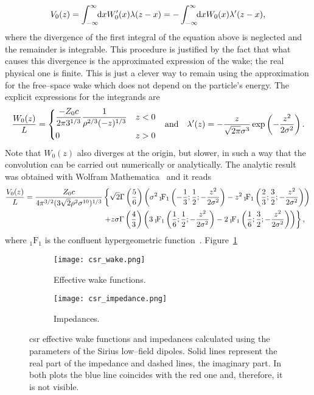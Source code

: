     \begin{align}\label{eq:csr_convolution}
        V_0(z) = \int_{-\infty}^{\infty}\!\!\text{d}x W'_0(x)\lambda(z-x) = -\int_{-\infty}^{\infty}\!\!\text{d}x W_0(x)\lambda'(z-x),
    \end{align}
    where the divergence of the first integral of the equation above is neglected and the remainder is integrable. This procedure is justified by the fact that what causes this divergence is the approximated expression of the wake; the real physical one is finite. This is just a clever way to remain using the approximation for the free--space wake which does not depend on the particle's energy. The explicit expressions for the integrands are
    \begin{align}
        \frac{W_0(z)}{L} =
        \begin{dcases}
            \frac{-Z_0 c}{2 \pi 3^{1/3}} \frac{1}{\rho^{2/3}(-z)^{1/3}} & z<0\\
            0 & z>0
        \end{dcases}& &\text{and} &&\lambda'(z) = -\frac{z}{\sqrt{2\pi}\sigma^3}\exp\left(-\frac{z^2}{2\sigma^2}\right).
    \end{align}
    Note that $W_0(z)$ also diverges at the origin, but slower, in such a way that the convolution can be carried out numerically or analytically. The analytic result was obtained with Wolfram Mathematica~\cite{WolframResearchInc.2016} and it reads
    \begin{align}\nonumber
        \frac{V_0(z)}{L} =
        \frac{Z_0 c}{4\pi^{3/2}(3\sqrt{2}\rho^2\sigma^{10})^{1/3}}
        &\left\{
            \sqrt{2}\Gamma\left(\frac56\right)
            \left(
                \sigma^2{\,}_{1}\!\text{F}_{1}\left(-\frac13;\frac12;-\frac{z^2}{2\sigma^2}\right) -
                      z^2{\,}_{1}\!\text{F}_{1}\left(\frac23;\frac32;-\frac{z^2}{2\sigma^2}\right)
                \right)\right. \\\nonumber
        &   \left.+ z\sigma\Gamma\left(\frac43\right)
            \left(
                 3{\,}_{1}\!\text{F}_{1}\left(\frac16;\frac12;-\frac{z^2}{2\sigma^2}\right) -
                 2{\,}_{1}\!\text{F}_{1}\left(\frac16;\frac32;-\frac{z^2}{2\sigma^2}\right)\right)\right\},
    \end{align}
    where ${}_1\!\text{F}_1$ is the confluent hypergeometric function~\cite{wiki2017b}.
    Figure~\ref{fig:csr_wake}
    \begin{figure}
        \centering
        \begin{subfigure}[c]{0.48\textwidth}
            \centering
            \texttt{[image: csr\_wake.png]}
            \caption{Effective wake functions.}
            \label{fig:csr_wake}
        \end{subfigure}\hfill
        \begin{subfigure}[c]{0.48\textwidth}
            \centering
            \texttt{[image: csr\_impedance.png]}
            \caption{Impedances.}
            \label{fig:csr_impedance}
        \end{subfigure}
        \caption{\gls{csr} effective wake functions and impedances calculated using the parameters of the Sirius low--field dipoles. Solid lines represent the real part of the impedance and dashed lines, the imaginary part. In both plots the blue line coincides with the red one and, therefore, it is not visible. }
    \end{figure}
